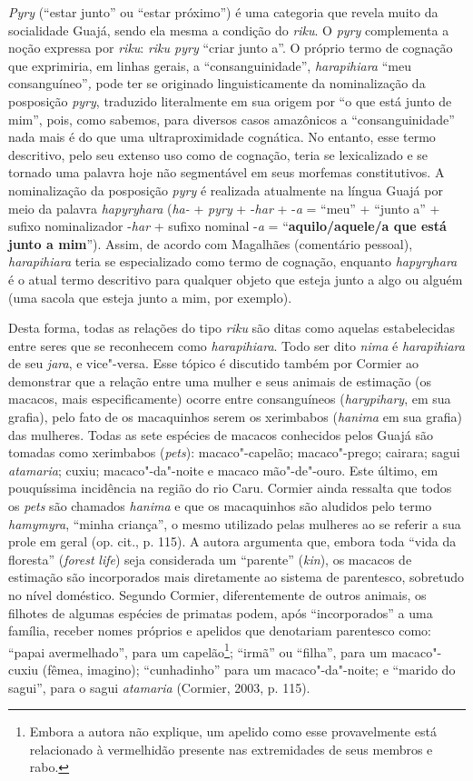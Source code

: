 \emph{Pyry} (``estar junto'' ou ``estar próximo'') é uma categoria que
revela muito da socialidade Guajá, sendo ela mesma a condição do
\emph{riku}. O \emph{pyry} complementa a noção expressa por \emph{riku}:
\emph{riku pyry} ``criar junto a''. O próprio termo de cognação que
exprimiria, em linhas gerais, a ``consanguinidade'', \emph{harapihiara}
``meu consanguíneo''\emph{,} pode ter se originado linguisticamente da
nominalização da posposição \emph{pyry}, traduzido literalmente em sua
origem por ``o que está junto de mim'', pois, como sabemos, para diversos
casos amazônicos a ``consanguinidade'' nada mais é do que uma
ultraproximidade cognática. No entanto, esse termo descritivo, pelo seu
extenso uso como de cognação, teria se lexicalizado e se tornado uma
palavra hoje não segmentável em seus morfemas constitutivos. A
nominalização da posposição \emph{pyry} é realizada atualmente na língua
Guajá por meio da palavra \emph{hapyryhara} (\emph{ha-} + \emph{pyry} +
-\emph{har} + -\emph{a} = ``meu'' + ``junto a'' + sufixo nominalizador
-\emph{har} + sufixo nominal -\emph{a} = ``\textbf{aquilo/aquele/a que
está junto a mim}''). Assim, de acordo com Magalhães (comentário
pessoal), \emph{harapihiara} teria se especializado como termo de
cognação, enquanto \emph{hapyryhara} é o atual termo descritivo para
qualquer objeto que esteja junto a algo ou alguém (uma sacola que esteja
junto a mim, por exemplo).

Desta forma, todas as relações do tipo \emph{riku} são ditas como
aquelas estabelecidas entre seres que se reconhecem como
\emph{harapihiara}. Todo ser dito \emph{nima} é \emph{harapihiara} de
seu \emph{jara}, e vice"-versa. Esse tópico é discutido também por
Cormier ao demonstrar que a relação entre uma mulher e seus animais de
estimação (os macacos, mais especificamente) ocorre entre consanguíneos
(\emph{harypihary}, em sua grafia), pelo fato de os macaquinhos serem os
xerimbabos (\emph{hanima} em sua grafia) das mulheres. Todas as sete
espécies de macacos conhecidos pelos Guajá são tomadas como xerimbabos
(\emph{pets}): macaco"-capelão; macaco"-prego; cairara; sagui
\emph{atamaria}; cuxiu; macaco"-da"-noite e macaco mão"-de"-ouro. Este
último, em pouquíssima incidência na região do rio Caru. Cormier ainda
ressalta que todos os \emph{pets} são chamados \emph{hanima} e que os
macaquinhos são aludidos pelo termo \emph{hamymyra}, ``minha criança'', o
mesmo utilizado pelas mulheres ao se referir a sua prole em geral (op.
cit., p. 115). A autora argumenta que, embora toda ``vida da floresta''
(\emph{forest} \emph{life}) seja considerada um ``parente'' (\emph{kin}),
os macacos de estimação são incorporados mais diretamente ao sistema de
parentesco, sobretudo no nível doméstico. Segundo Cormier,
diferentemente de outros animais, os filhotes de algumas espécies de
primatas podem, após ``incorporados'' a uma família, receber nomes
próprios e apelidos que denotariam parentesco como: ``papai avermelhado'',
para um capelão\footnote{Embora a autora não explique, um apelido como
  esse provavelmente está relacionado à vermelhidão presente nas
  extremidades de seus membros e rabo.}; ``irmã'' ou ``filha'', para um
macaco"-cuxiu (fêmea, imagino); ``cunhadinho'' para um macaco"-da"-noite; e
``marido do sagui'', para o sagui \emph{atamaria} (Cormier, 2003, p. 115).

